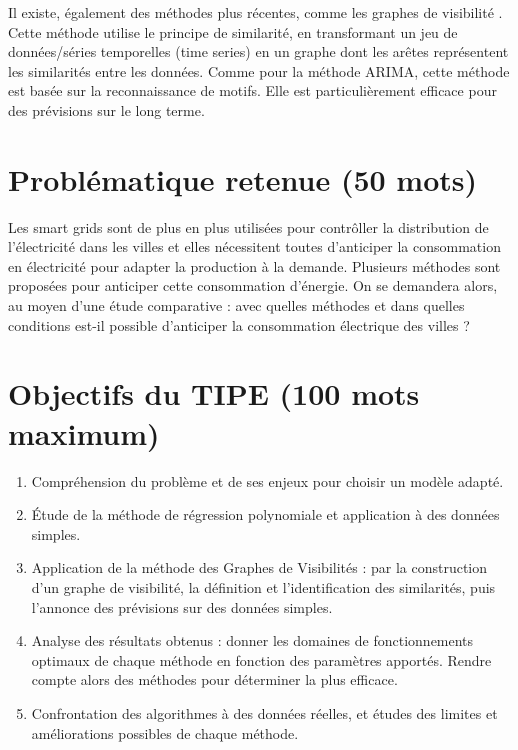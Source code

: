 \documentclass[12pt,a4paper]{article}
\begin{document}
Il existe, également des méthodes plus récentes, comme les graphes de visibilité \cite{visigraphPhyA, visigraphTEPJB}. Cette méthode utilise le principe de similarité, en transformant un jeu de données/séries temporelles (time series) en un graphe \cite{visigraphPNAS} dont les arêtes représentent les similarités entre les données. Comme pour la méthode ARIMA, cette méthode est basée sur la reconnaissance de motifs. Elle est particulièrement efficace pour des prévisions sur le long terme.

\section*{Problématique retenue (50 mots)}
 Les smart grids sont de plus en plus utilisées pour contrôller la distribution de l'électricité dans les villes et elles nécessitent toutes d'anticiper la consommation en électricité pour adapter la production à la demande. Plusieurs méthodes sont proposées pour anticiper cette consommation d'énergie. On se demandera alors, au moyen d'une étude comparative : avec quelles méthodes et dans quelles conditions est-il possible d'anticiper la consommation électrique des villes ?
\section*{Objectifs du TIPE (100 mots maximum)}
\begin{enumerate}
    \item   Compréhension du problème et de ses enjeux pour choisir un modèle adapté.

    \item   Étude de la méthode de régression polynomiale et application à des données simples.
	
    \item   Application de la méthode des Graphes de Visibilités : par la construction d'un graphe de visibilité, la définition et l'identification des similarités, puis l'annonce des prévisions sur des données simples.
    
    \item	Analyse des résultats obtenus : donner les domaines de fonctionnements optimaux de chaque méthode en fonction des paramètres apportés. Rendre compte alors des méthodes pour déterminer la plus efficace.
    
    \item   Confrontation des algorithmes à des données réelles, et études des limites et améliorations possibles de chaque méthode.
\end{enumerate}
\end{document}
